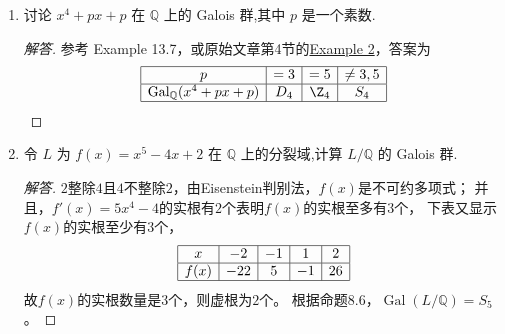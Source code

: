 \begin{enumerate}
\begin{proof}[解答]
$$\begin{array}{|l|l|}
    \hline\end{array}$$
    把本题中的数字和域代入，即$a=3,4,5$，$b=5$，$F=\mathbb{Q}$，结论是
    $$\begin{array}{|l|l|l|l|}
    \hline \alpha=\sqrt{3+\sqrt{5}} & f(x)=x^4-6x^2+4 & \alpha\beta=2\in\mathbb{Q} & G\cong\Z_2\times\Z_2\\
    \hline \alpha=\sqrt{4+\sqrt{5}} & f(x)=x^4-8x^2+11 & \alpha\beta=\sqrt{11}\notin\mathbb{Q},\,\delta=2\sqrt{55}\notin\mathbb{Q} & G \cong D_4\\
    \hline \alpha=\sqrt{5+\sqrt{5}} & f(x)=x^4-10x^2+20 & \alpha\beta=2\sqrt{5}\notin\mathbb{Q},\,\delta=20\in\mathbb{Q} & G\cong\Z_4\\
    \hline\end{array}\qedhere$$
\end{proof}
\item 讨论 $ x^4 + px + p $ 在 $\mathbb{Q}$ 上的 Galois 群,其中 $ p $ 是一个素数.
\begin{proof}[解答]
    参考\cite{Mo} Example 13.7，或原始文章第4节的\href{https://www.jstor.org/stable/2323198?seq=4}{Example 2}，答案为
    $$\begin{array}{|c|c|c|c|}
    \hline p&=3&=5&\ne3,5\\ \hline
    \operatorname{Gal}_{\mathbb{Q}}(x^4+px+p)&D_4&\Z_4&S_4\\ \hline
    \end{array}\qedhere$$
\end{proof}
\item 令 $ L $ 为 $ f(x) = x^5 - 4x + 2 $ 在 $\mathbb{Q}$ 上的分裂域,计算 $ L/\mathbb{Q} $ 的 Galois 群.
\begin{proof}[解答]
    $2$整除$4$且$4$不整除$2$，由Eisenstein判别法，$f(x)$是不可约多项式；
    并且，$f'(x)=5x^4-4$的实根有$2$个表明$f(x)$的实根至多有$3$个，
    下表又显示$f(x)$的实根至少有$3$个，
    $$\begin{array}{|c|c|c|c|c|}
    \hline x&-2&-1&1&2\\ \hline
    f(x)&-22&5&-1&26\\ \hline
    \end{array}$$
    故$f(x)$的实根数量是$3$个，则虚根为$2$个。
    根据命题8.6，$\operatorname{Gal}(L/\mathbb{Q})=S_5$。
\end{proof}


\end{enumerate}
